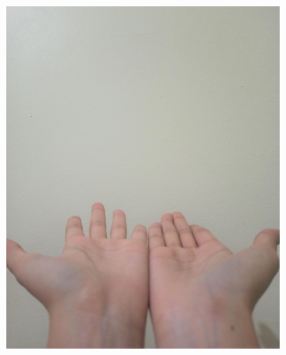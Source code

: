 \documentclass[conference]{IEEEtran}
\begin{document}
\begin{figure} [h]
\begin{center}
\begin{subfigure}[t]{0.11\textwidth}
				\includegraphics[width=\textwidth]{img/pola6.jpg}
				\caption{\label{fig:gs6}}
			\end{subfigure}
			\hspace{0.1em}
			\begin{subfigure}[t]{0.11\textwidth}
				\centering

\end{subfigure}
\end{center}
\end{figure}
\end{document}
